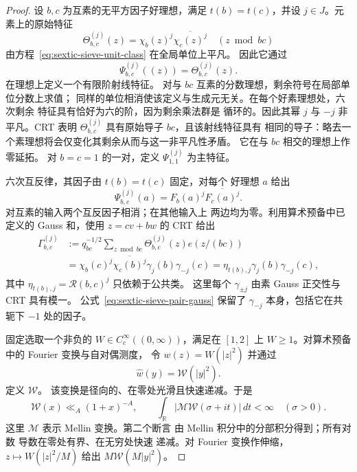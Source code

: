 \documentclass[11pt,a4paper]{article}
\numberwithin{equation}{section}
\numberwithin{figure}{section}
\theoremstyle{definition}
\theoremstyle{remark}
\begin{document}
\begin{proof}
设 $b,c$ 为互素的无平方因子好理想，满足 $t(b)=t(c)$，并设
$j\in J$。元素上的原始特征
\[
 \Theta_{b,c}^{(j)}(z)=\chi_b(z)^j\overline{\chi_c(z)^j}
       \quad (z\bmod bc)
\]
由方程~\eqref{eq:sextic-sieve-unit-class} 在全局单位上平凡。
因此它通过
\[
 \Psi_{b,c}^{(j)}((z))=\Theta_{b,c}^{(j)}(z).
\]
在理想上定义一个有限阶射线特征。
对与 $bc$ 互素的分数理想，剩余符号在局部单位分数上求值；
同样的单位相消使该定义与生成元无关。在每个好素理想处，六次剩余
特征具有恰好为六的阶，因为剩余乘法群是
循环的。因此其幂 $j$ 与 $-j$ 非平凡。CRT 表明
$\Theta_{b,c}^{(j)}$ 具有原始导子 $bc$，且该射线特征具有
相同的导子：略去一个素理想将会仅变化其剩余从而与这一非平凡性矛盾。
它在与 $bc$ 相交的理想上作零延拓。
对 $b=c=1$ 的一对，定义 $\Psi_{1,1}^{(j)}$ 为主特征。

六次互反律，其因子由 $t(b)=t(c)$ 固定，对每个
好理想 $a$ 给出
\begin{equation}\label{eq:sextic-sieve-pair-values}
 \Psi_{b,c}^{(j)}(a)=F_b(a)^j\overline{F_c(a)^j}.
\end{equation}
对互素的输入两个互反因子相消；在其他输入上
两边均为零。利用算术预备中已定义的 Gauss 和，使用 $z=cv+bw$ 的 CRT 给出
\begin{equation}\label{eq:sextic-sieve-pair-gauss}
 \begin{split}
 \Gamma_{b,c}^{(j)}
 &:=q_{bc}^{-1/2}\sum_{z\bmod bc}\Theta_{b,c}^{(j)}(z)e(z/(bc))\\
 &=\chi_b(c)^j\overline{\chi_c(b)^j}\gamma_j(b)\gamma_{-j}(c)
  =\eta_{t(b),j}\gamma_j(b)\gamma_{-j}(c),
 \end{split}
\end{equation}
其中 $\eta_{t(b),j}=\mathcal R(b,c)^j$ 只依赖于公共类。
这里每个 $\gamma_{\pm j}$ 由素 Gauss 正交性与 CRT 具有模一。
公式~\eqref{eq:sextic-sieve-pair-gauss} 保留了
$\gamma_{-j}$ 本身，包括它在共轭下 $-1$ 处的因子。

固定选取一个非负的 $W\in C_c^\infty((0,\infty))$，满足在
$[1,2]$ 上 $W\ge1$。对算术预备中的 Fourier 变换与自对偶测度，
令 $w(z)=W(|z|^2)$ 并通过
\[
 \widehat w(y)=\mathscr W(|y|^2).
\]
定义 $\mathscr W$。
该变换是径向的、在零处光滑且快速递减。于是
\begin{equation}\label{eq:sextic-sieve-transform-bounds}
 \mathscr W(x)\ll_A(1+x)^{-A},\qquad
 \int_{\mathbb R}|\mathcal M\mathscr W(\sigma+it)|\,dt<\infty
       \quad(\sigma>0).
\end{equation}
这里 $\mathcal M$ 表示 Mellin 变换。第二个断言
由 Mellin 积分中的分部积分得到；所有对数
导数在零处有界、在无穷处快速
递减。对 Fourier 变换作伸缩，$z\mapsto W(|z|^2/M)$ 给出
$M\mathscr W(M|y|^2)$。


\end{proof}
\end{document}
